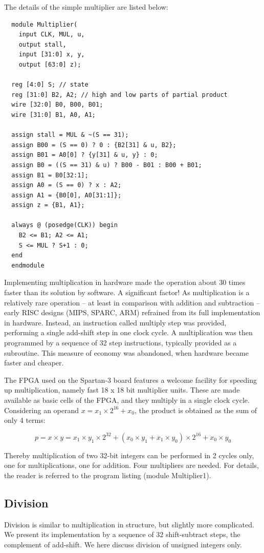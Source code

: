 The details of the simple multiplier are listed below:

\begin{verbatim}
  module Multiplier(
    input CLK, MUL, u,
    output stall,
    input [31:0] x, y,
    output [63:0] z);
 
  reg [4:0] S; // state
  reg [31:0] B2, A2; // high and low parts of partial product
  wire [32:0] B0, B00, B01;
  wire [31:0] B1, A0, A1;
 
  assign stall = MUL & ~(S == 31);
  assign B00 = (S == 0) ? 0 : {B2[31] & u, B2};
  assign B01 = A0[0] ? {y[31] & u, y} : 0;
  assign B0 = ((S == 31) & u) ? B00 - B01 : B00 + B01;
  assign B1 = B0[32:1];
  assign A0 = (S == 0) ? x : A2;
  assign A1 = {B0[0], A0[31:1]};
  assign z = {B1, A1};
 
  always @ (posedge(CLK)) begin
    B2 <= B1; A2 <= A1;
    S <= MUL ? S+1 : 0;
  end
  endmodule
\end{verbatim}

Implementing multiplication in hardware made the operation about 30 times faster than its solution
by software. A significant factor! As multiplication is a relatively rare operation – at least in
comparison with addition and subtraction – early RISC designs (MIPS, SPARC, ARM) refrained
from its full implementation in hardware. Instead, an instruction called multiply step was provided,
performing a single add-shift step in one clock cycle. A multiplication was then programmed by a
sequence of 32 step instructions, typically provided as a subroutine. This measure of economy
was abandoned, when hardware became faster and cheaper.

The FPGA used on the Spartan-3 board features a welcome facility for speeding up multiplication,
namely fast 18 x 18 bit multiplier units. These are made available as basic cells of the FPGA, and
they multiply in a single clock cycle. Considering an operand $x = x_1×2^{16} + x_0$, the product is
obtained as the sum of only 4 terms:

\[ p = x × y = x_1×y_1×2^{32} + (x_0×y_1 + x_1×y_0)×2^{16} + x_0×y_0 \]

Thereby multiplication of two 32-bit integers can be performed in 2 cycles only, one for
multiplications, one for addition. Four multipliers are needed. For details, the reader is referred to
the program listing (module Multiplier1).

\subsection{Division}
Division is similar to multiplication in structure, but slightly more complicated. We present its
implementation by a sequence of 32 shift-subtract steps, the complement of add-shift. We here
discuss division of unsigned integers only.

